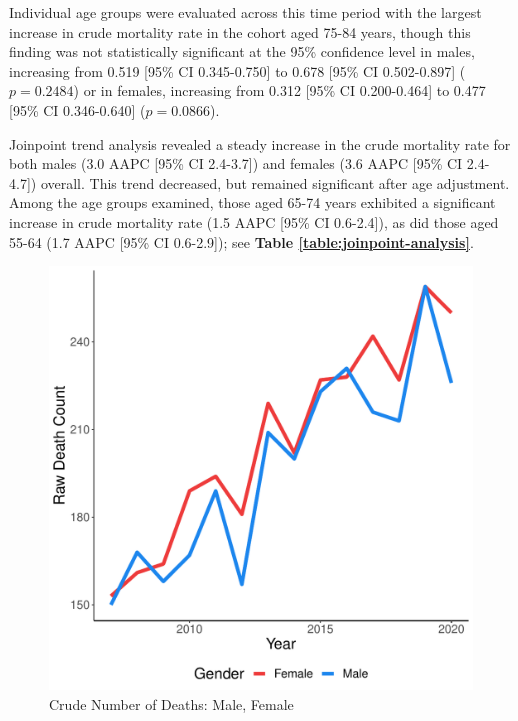 \documentclass[12pt]{article}
\begin{document}
\par \bigskip

\noindent Individual age groups were evaluated across this time period with the largest increase in crude mortality rate in the cohort aged 75-84 years, though this finding was not statistically significant at the 95\% confidence level in males, increasing from 0.519 [95\% CI 0.345-0.750] to 0.678 [95\% CI 0.502-0.897] ($p = 0.2484$) or in females, increasing from 0.312 [95\% CI 0.200-0.464] to 0.477 [95\% CI 0.346-0.640] ($p = 0.0866$).

\par \bigskip

\noindent Joinpoint trend analysis revealed a steady increase in the crude mortality rate for both males (3.0 AAPC [95\% CI 2.4-3.7]) and females (3.6 AAPC [95\% CI 2.4-4.7]) overall. This trend decreased, but remained significant after age adjustment. Among the age groups examined, those aged 65-74 years exhibited a significant increase in crude mortality rate (1.5 AAPC [95\% CI 0.6-2.4]), as did those aged 55-64 (1.7 AAPC [95\% CI 0.6-2.9]); see \textbf{Table \ref{table:joinpoint-analysis}}.


\newpage

\begin{figure}
    \centering
    \includegraphics[scale=0.5]{analysis/output/raw_deaths_by_gender_plot.pdf}
    \caption{Crude Number of Deaths: Male, Female}
    \label{fig:crude_deaths_by_gender}
\end{figure}
\end{document}
